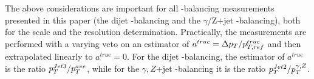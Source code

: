 The above considerations are important for all \pt-balancing measurements presented in this paper (the dijet \pt-balancing and the $\gamma$/Z+jet \pt-balancing), both for the scale and the resolution determination. Practically, the measurements are performed with a varying veto on an estimator of $a^{true}=\Delta p_{{T}}/p_{T,ref}^{true}$ and then extrapolated linearly to $a^{true}=0$. For the dijet \pt-balancing, the estimator of $a^{true}$ is the ratio $p_{{T}}^{{Jet}3}/p_{{T}}^{{ave}}$, while for the $\gamma,Z$+jet \pt-balancing it is the ratio $p_{{T}}^{{Jet}2}/p_{{T}}^{\gamma,Z}$.  




